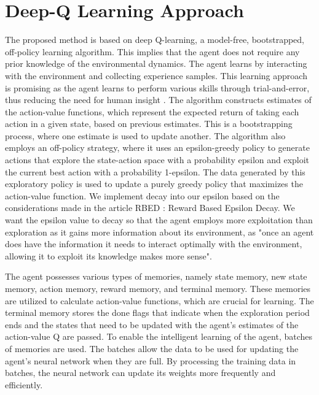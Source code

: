 \documentclass[letterpaper]{article} %
\begin{document}
\section{Deep-Q Learning Approach}

The proposed method is based on deep Q-learning, a model-free, bootstrapped, off-policy learning algorithm. This implies that the agent does not require any prior knowledge of the environmental dynamics. The agent learns by interacting with the environment and collecting experience samples. This learning approach is promising as the agent learns to perform various skills through trial-and-error, thus reducing the need for human insight \cite{2018-TOG-deepMimic}. The algorithm constructs estimates of the action-value functions, which represent the expected return of taking each action in a given state, based on previous estimates. This is a bootstrapping process, where one estimate is used to update another. The algorithm also employs an off-policy strategy, where it uses an epsilon-greedy policy to generate actions that explore the state-action space with a probability epsilon and exploit the current best action with a probability 1-epsilon. The data generated by this exploratory policy is used to update a purely greedy policy that maximizes the action-value function. We implement decay into our epsilon based on the considerations made in the article RBED : Reward Based Epsilon Decay\cite{maroti_2019_rbed}. We want the epsilon value to decay so that the agent employs more exploitation than exploration as it gains more information about its environment, as "once an agent does have the information it
needs to interact optimally with the environment, allowing it to exploit its knowledge makes more sense"\cite{maroti_2019_rbed}.  

\par The agent possesses various types of memories, namely state memory, new state memory, action memory, reward memory, and terminal memory. These memories are utilized to calculate action-value functions, which are crucial for learning. The terminal memory stores the done flags that indicate when the exploration period ends and the states that need to be updated with the agent's estimates of the action-value Q are passed. To enable the intelligent learning of the agent, batches of memories are used. The batches allow the data to be used for updating the agent's neural network when they are full. By processing the training data in batches, the neural network can update its weights more frequently and efficiently.
\end{document}

